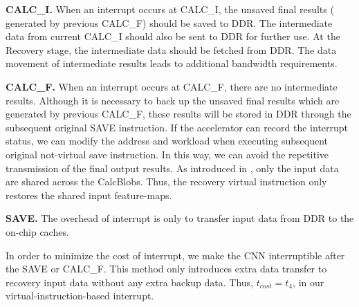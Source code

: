 \textbf{CALC\_I.} 
When an interrupt occurs at CALC\_I, the unsaved final results ( generated by previous CALC\_F) should be saved to DDR. The intermediate data from current CALC\_I should also be sent to DDR for further use. At the Recovery stage, the intermediate data should be fetched from DDR. The data movement of intermediate results leads to additional bandwidth requirements.


\textbf{CALC\_F.}
When an interrupt occurs at CALC\_F, there are no intermediate results. 
Although it is necessary to back up the unsaved final results which are generated by previous CALC\_F, these results will be stored in DDR through the subsequent original SAVE instruction.
If the accelerator can record the interrupt status, we can modify the address and workload when executing subsequent original not-virtual save instruction.
In this way, we can avoid the repetitive transmission of the final output results.
As introduced in , only the input data are shared across the CalcBlobs. Thus, the recovery virtual instruction only restores the shared input feature-maps.



\textbf{SAVE.}
The overhead of interrupt is only to transfer input data from DDR to the on-chip caches. 

In order to minimize the cost of interrupt, we make the CNN interruptible after the SAVE or CALC\_F. This method only introduces extra data transfer to recovery input data without any extra backup data. Thus, $t_{cost} = t_4$, in our virtual-instruction-based interrupt.



